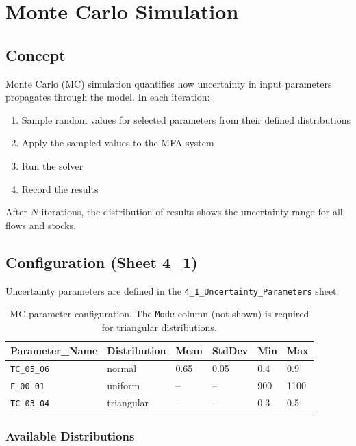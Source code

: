 \chapter{Monte Carlo Simulation}
\label{ch:montecarlo}

\section{Concept}

Monte Carlo (MC) simulation quantifies how uncertainty in input parameters propagates through the model. In each iteration:
\begin{enumerate}
  \item Sample random values for selected parameters from their defined distributions
  \item Apply the sampled values to the MFA system
  \item Run the solver
  \item Record the results
\end{enumerate}

After $N$ iterations, the distribution of results shows the uncertainty range for all flows and stocks.

\section{Configuration (Sheet 4\_1)}

Uncertainty parameters are defined in the \texttt{4\_1\_Uncertainty\_Parameters} sheet:

\begin{table}[h]
\centering
\begin{tabular}{llllll}
\toprule
\textbf{Parameter\_Name} & \textbf{Distribution} & \textbf{Mean} & \textbf{StdDev} & \textbf{Min} & \textbf{Max} \\
\midrule
\texttt{TC\_05\_06} & normal & 0.65 & 0.05 & 0.4 & 0.9 \\
\texttt{F\_00\_01} & uniform & -- & -- & 900 & 1100 \\
\texttt{TC\_03\_04} & triangular & -- & -- & 0.3 & 0.5 \\
\bottomrule
\end{tabular}
\caption{MC parameter configuration. The \texttt{Mode} column (not shown) is required for triangular distributions.}
\end{table}

\subsection{Available Distributions}

